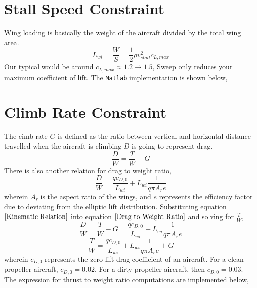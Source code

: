 \documentclass[letter, 12pt]{article}
\begin{document}
\begin{center}
\section{Stall Speed Constraint}
\begin{comment}
\end{comment}
Wing loading is basically the weight of the aircraft divided by the total wing area.
$$L_{wi} = \frac{W}{S} = \frac{1}{2}\rho v_{stall}^{2} c_{L,max}$$
Our typical would be around $c_{L,max} \approx 1.2 \to 1.5$, 
Sweep only reduces your maximum coefficient of lift. The \texttt{Matlab} implementation is shown below,


\section{Climb Rate Constraint}
\begin{comment}
\end{comment}
The cimb rate $G$ is defined as the ratio between vertical and horizontal distance travelled when the aircraft is climbing
$D$ is going to represent drag. 
\begin{equation}\frac{D}{W} = \frac{T}{W } - G \label{Kinematic Relation}\end{equation}
There is also another relation for drag to weight ratio,
\begin{equation}\frac{D}{W } = \frac{qc_{D,0}}{L_{wi}} + L_{wi}\frac{1}{q\pi A_{r}e} \label{Drag to Weight Ratio}\end{equation}
wherein $A_{r}$ is the aspect ratio of the wings, and $e$ represents the efficiency factor due to deviating from the elliptic lift distribution.
Substituting equation $\ref{Kinematic Relation}$ into equation $\ref{Drag to Weight Ratio}$ and solving for $\displaystyle\frac{T}{W }$,
$$\frac{D}{W } = \frac{T}{W } - G  = \frac{qc_{D,0}}{L_{wi}} + L_{wi}\frac{1}{q\pi A_{r}e} $$
$$\frac{T}{W }  = \frac{qc_{D,0}}{L_{wi}} + L_{wi}\frac{1}{q\pi A_{r}e} + G $$
wherein $c_{D,0}$ represents the zero-lift drag coefficient of an aircraft. For a clean propeller aircraft, $c_{D,0} = 0.02$. For a dirty propeller aircraft, then $c_{D,0} = 0.03$.
The expression for thrust to weight ratio computations are implemented below,





\end{center}
\end{document}
